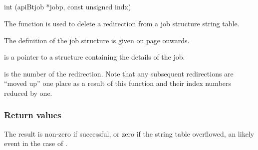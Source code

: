 \subsection{\funcnameXBdelredir{}}

\begin{expara}

int \funcnameXBdelredir{}(apiBtjob *jobp, const unsigned indx)

\end{expara}

The function \funcXBdelredir{} is used to delete a redirection from a job structure string table.

The definition of the job structure is given on page \pageref{bkm:Jobstructure} onwards.

 is a pointer to a structure containing the details of the job.

 is the number of the redirection. Note that any subsequent redirections are ``moved up''
one place as a result of this function and their index numbers reduced by one.

\subsubsection{Return values}
The result is non-zero if successful, or zero if the string table overflowed, an likely event in the case of \funcXBdelredir{}.

